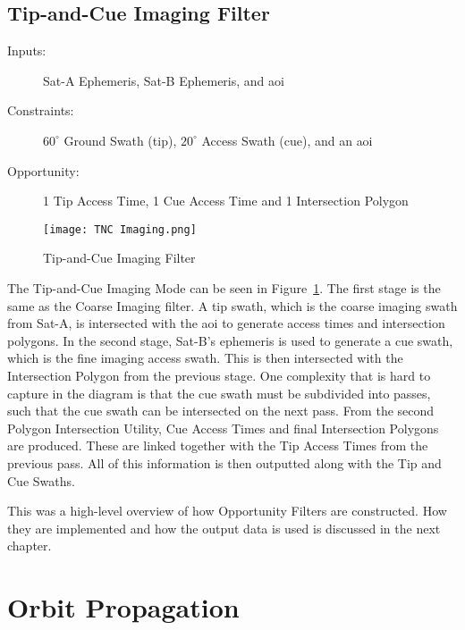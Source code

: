 \subsection{Tip-and-Cue Imaging Filter}

\begin{description} 

    \item[Inputs:]  Sat-A Ephemeris, Sat-B Ephemeris, and  \gls{aoi}

    \item[Constraints:] $60^\circ$ Ground Swath (tip), $20^\circ$ Access Swath (cue), and an \gls{aoi}

    \item[Opportunity:] 1 Tip Access Time, 1 Cue Access Time and 1 Intersection Polygon

\end{description} 

\begin{figure}[h]
    \centering
    \texttt{[image: TNC Imaging.png]} 
    \caption{Tip-and-Cue Imaging Filter}
    \label{fig:filter-2} 
\end{figure}


The Tip-and-Cue Imaging Mode can be seen in Figure~\ref{fig:filter-2}. The
first stage is the same as the Coarse Imaging filter. A tip swath, which is the
coarse imaging swath from Sat-A, is intersected with the \gls{aoi} to generate
access times and intersection polygons. In the second stage, Sat-B's ephemeris
is used to generate a cue swath, which is the fine imaging access swath. This
is then intersected with the Intersection Polygon from the previous stage. One
complexity that is hard to capture in the diagram is that the cue swath must be
subdivided into passes, such that the cue swath can be intersected on the next
pass. From the second Polygon Intersection Utility, Cue Access Times and final
Intersection Polygons are produced. These are linked together with the Tip
Access Times from the previous pass. All of this information is then outputted
along with the Tip and Cue Swaths.

This was a high-level overview of how Opportunity Filters are constructed. How
they are implemented and how the output data is used is discussed in the next
chapter.


\section{Orbit Propagation}




